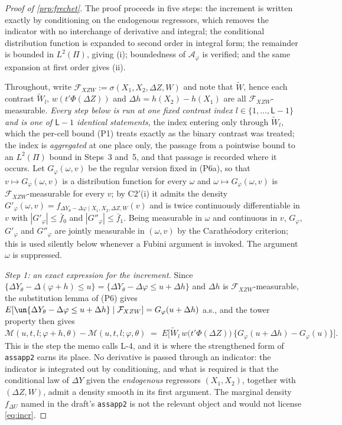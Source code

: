 \begin{proof}[Proof of \cref{prp:frechet}]
The proof proceeds in five steps: the increment is written exactly by conditioning on the endogenous
regressors, which removes the indicator with no interchange of derivative and integral; the conditional
distribution function is expanded to second order in integral form; the remainder is bounded in
$L^{2}(\Pi)$, giving (i); boundedness of $\mathcal A_\varphi$ is verified; and the same expansion at
first order gives (ii).

Throughout, write $\mathcal F_{XZW}:=\sigma(X_1,X_2,\Delta Z,W)$ and note that $\widetilde W$, hence
each contrast $\widetilde W_l$, 
$w(t'\Phi(\Delta Z))$ and $\Delta h=h(X_2)-h(X_1)$ are all $\mathcal F_{XZW}$-measurable.
\emph{Every step below is run at one fixed contrast index $l\in\{1,\dots,\mathsf L-1\}$ and is one of
$\mathsf L-1$ identical statements}, the index entering only through $\widetilde W_l$, which the
per-cell bound \textup{(P1)} treats exactly as the binary contrast was treated; the index is
\emph{aggregated} at one place only, the passage from a pointwise bound to an $L^{2}(\Pi)$ bound in
Steps~3 and~5, and that passage is recorded where it occurs. Let
$G_\varphi(\omega,v)$ be the regular version fixed in (P6a), so that $v\mapsto G_\varphi(\omega,v)$ is a
distribution function for every $\omega$ and $\omega\mapsto G_\varphi(\omega,v)$ is
$\mathcal F_{XZW}$-measurable for every $v$; by C2$'$(i) it admits the density
$G'_\varphi(\omega,v)=f_{\Delta Y_\theta-\Delta\varphi\mid X_1,X_2,\Delta Z,W}(v)$ and is twice
continuously differentiable in $v$ with $|G'_\varphi|\le\bar f_0$ and $|G''_\varphi|\le\bar f_1$. Being
measurable in $\omega$ and continuous in $v$, $G_\varphi$, $G'_\varphi$ and $G''_\varphi$ are jointly
measurable in $(\omega,v)$ by the Carath\'eodory criterion; this is used silently below whenever a
Fubini argument is invoked. The argument $\omega$ is suppressed.

\emph{Step 1: an exact expression for the increment.}
Since $\{\Delta Y_\theta-\Delta(\varphi+h)\le u\}=\{\Delta Y_\theta-\Delta\varphi\le u+\Delta h\}$ and
$\Delta h$ is $\mathcal F_{XZW}$-measurable, the substitution lemma of (P6) gives
$E[\un\{\Delta Y_\theta-\Delta\varphi\le u+\Delta h\}\mid\mathcal F_{XZW}]=G_\varphi(u+\Delta h)$ a.s.,
and the tower property then gives
\begin{equation}\label{eq:incr}
\mathcal M(u,t,l;\varphi+h,\theta)-\mathcal M(u,t,l;\varphi,\theta)
\;=\;E\Big[\widetilde W_l\,w\big(t'\Phi(\Delta Z)\big)\,\big\{G_\varphi(u+\Delta h)-G_\varphi(u)\big\}\Big].
\end{equation}
This is the step the memo calls L-4, and it is where the strengthened form of \texttt{assapp2}
earns its place. No derivative is passed through an indicator: the indicator is integrated out by
conditioning, and what is required is that the conditional law of $\Delta Y$ given the \emph{endogenous}
regressors $(X_1,X_2)$, together with $(\Delta Z,W)$, admit a density smooth in its first argument. The
marginal density $f_{\Delta U}$ named in the draft's \texttt{assapp2} is not the relevant object and
would not license \eqref{eq:incr}.


\end{proof}
